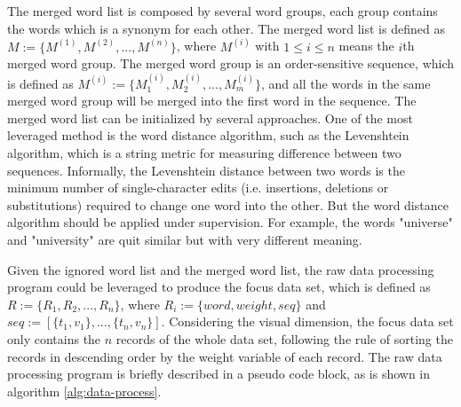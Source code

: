 \documentclass[12pt]{iopart}
\begin{document}
The merged word list is composed by several word groups, each group contains the words which is a synonym for each other. The merged word list is defined as $ M := \{ M^{(1)}, M^{(2)},...,M^{(n)} \} $, where $M^{(i)}$ with $1 \leq i \leq n$ means the $i$th merged word group. The merged word group is an order-sensitive sequence, which is defined as $M^{(i)} := \{ M_1^{(i)},M_2^{(i)},...,M_m^{(i)}\}$, and all the words in the same merged word group will be merged into the first word in the sequence. The merged word list can be initialized by several approaches. One of the most leveraged method is the word distance algorithm, such as the Levenshtein algorithm, which is a string metric for measuring difference between two sequences. Informally, the Levenshtein distance between two words is the minimum number of single-character edits (i.e. insertions, deletions or substitutions) required to change one word into the other. But the word distance algorithm should be applied under supervision. For example, the words "universe" and "university" are quit similar but with very different meaning.

Given the ignored word list and the merged word list, the raw data processing program could be leveraged to produce the focus data set, which is defined as $R := \{R_1,R_2,...,R_n\}$, where $R_i := \{word, weight, seq \}$ and $seq := [\{t_1,v_1\},...,\{t_n,v_n\}]$. Considering the visual dimension, the focus data set only contains the $n$ records of the whole data set, following the rule of sorting the records in descending order by the weight variable of each record. The raw data processing program is briefly described in a pseudo code block, as is shown in algorithm \ref{alg:data-process}.
\end{document}
